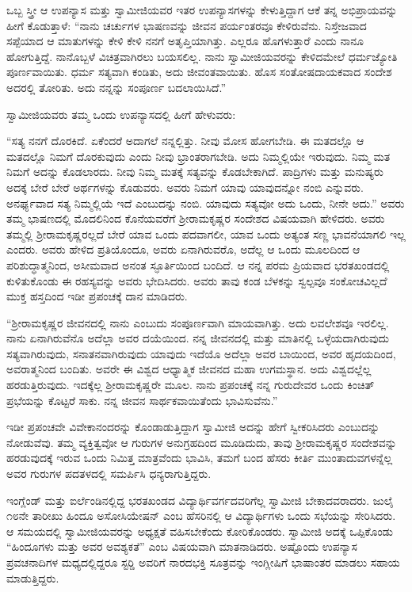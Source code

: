  ಒಬ್ಬ ಸ್ತ್ರೀ ಆ ಉಪನ್ಯಾಸ ಮತ್ತು ಸ್ವಾಮೀಜಿಯವರ ಇತರ ಉಪನ್ಯಾಸಗಳನ್ನು ಕೇಳುತ್ತಿದ್ದಾಗ ಆಕೆ ತನ್ನ ಅಭಿಪ್ರಾಯವನ್ನು ಹೀಗೆ ಕೊಡುತ್ತಾಳೆ: “ನಾನು ಚರ್ಚುಗಳ ಭಾಷಣವನ್ನು ಜೀವನ ಪರ್ಯಂತರವೂ ಕೇಳಿರುವೆನು. ನಿಸ್ತೇಜವಾದ ಸಪ್ಪೆಯಾದ ಆ ಮಾತುಗಳನ್ನು ಕೇಳಿ ಕೇಳಿ ನನಗೆ ಅತೃಪ್ತಿಯಾಗಿತ್ತು. ಎಲ್ಲರೂ ಹೊಗಳುತ್ತಾರೆ ಎಂದು ನಾನೂ ಹೋಗುತ್ತಿದ್ದೆ. ನಾನೊಬ್ಬಳೆ ವಿಚಿತ್ರವಾಗಿರಲು ಬಯಸಲಿಲ್ಲ. ನಾನು ಸ್ವಾಮೀಜಿಯವರನ್ನು ಕೇಳಿದಮೇಲೆ ಧರ್ಮಜ್ಯೋತಿ ಪೂರ್ಣವಾಯಿತು. ಧರ್ಮ ಸತ್ಯವಾಗಿ ಕಂಡಿತು, ಅದು ಜೀವಂತವಾಯಿತು. ಹೊಸ ಸಂತೋಷದಾಯಕವಾದ ಸಂದೇಶ ಅದರಲ್ಲಿ ತೋರಿತು. ಅದು ನನ್ನನ್ನು ಸಂಪೂರ್ಣ ಬದಲಾಯಿಸಿದೆ.” 

 ಸ್ವಾಮೀಜಿಯವರು ತಮ್ಮ ಒಂದು ಉಪನ್ಯಾಸದಲ್ಲಿ ಹೀಗೆ ಹೇಳುವರು: 

 “ಸತ್ಯ ನನಗೆ ದೊರಕಿದೆ. ಏಕೆಂದರೆ ಅದಾಗಲೆ ನನ್ನಲ್ಲಿತ್ತು. ನೀವು ಮೋಸ ಹೋಗಬೇಡಿ. ಈ ಮತದಲ್ಲೊ ಆ ಮತದಲ್ಲೊ ನಿಮಗೆ ದೊರಕುವುದು ಎಂದು ನೀವು ಭ್ರಾಂತರಾಗಬೇಡಿ. ಅದು ನಿಮ್ಮಲ್ಲಿಯೇ ಇರುವುದು. ನಿಮ್ಮ ಮತ ನಿಮಗೆ ಅದನ್ನು ಕೊಡಲಾರದು. ನೀವು ನಿಮ್ಮ ಮತಕ್ಕೆ ಸತ್ಯವನ್ನು ಕೊಡಬೇಕಾಗಿದೆ. ಪಾದ್ರಿಗಳು ಮತ್ತು ಮನುಷ್ಯರು ಅದಕ್ಕೆ ಬೇರೆ ಬೇರೆ ಅರ್ಥಗಳನ್ನು ಕೊಡುವರು. ಅವರು ನಿಮಗೆ ಯಾವು ಯಾವುದನ್ನೋ ನಂಬಿ ಎನ್ನುವರು. ಅನರ್ಘ್ಯವಾದ ಸತ್ಯ ನಿಮ್ಮಲ್ಲಿಯೆ ಇದೆ ಎಂಬುದನ್ನು ನಂಬಿ. ಯಾವುದು ಸತ್ಯವೋ ಅದು ಒಂದು, ನೀನೇ ಅದು.” ಅವರು ತಮ್ಮ ಭಾಷಣದಲ್ಲಿ ಮೊದಲಿನಿಂದ ಕೊನೆಯವರೆಗೆ ಶ‍್ರೀರಾಮಕೃಷ್ಣರ ಸಂದೇಶದ ವಿಷಯವಾಗಿ ಹೇಳಿದರು. ಅವರು ತಮ್ಮಲ್ಲಿ ಶ‍್ರೀರಾಮಕೃಷ್ಣರಲ್ಲದೆ ಬೇರೆ ಯಾವ ಒಂದು ಪದವಾಗಲೀ, ಯಾವ ಒಂದು ಅತ್ಯಂತ ಸಣ್ಣ ಭಾವನೆಯಾಗಲಿ ಇಲ್ಲ ಎಂದರು. ಅವರು ಹೇಳಿದ ಪ್ರತಿಯೊಂದೂ, ಅವರು ಏನಾಗಿರುವರೊ, ಅದೆಲ್ಲ ಆ ಒಂದು ಮೂಲದಿಂದ ಆ ಪರಿಶುದ್ಧಾತ್ಮನಿಂದ, ಅಸೀಮವಾದ ಅನಂತ ಸ್ಫೂರ್ತಿಯಿಂದ ಬಂದಿದೆ. ಆ ನನ್ನ ಪರಮ ಪ್ರಿಯವಾದ ಭರತಖಂಡದಲ್ಲಿ ಕುಳಿತುಕೊಂಡು ಈ ರಹಸ್ಯವನ್ನು ಅವರು ಭೇದಿಸಿದರು. ಅವರು ತಾವು ಕಂಡ ಬೆಳಕನ್ನು ಸ್ವಲ್ಪವೂ ಸಂಕೋಚವಿಲ್ಲದೆ ಮುಕ್ತ ಹಸ್ತದಿಂದ ಇಡೀ ಪ್ರಪಂಚಕ್ಕೆ ದಾನ ಮಾಡಿದರು. 

 “ಶ‍್ರೀರಾಮಕೃಷ್ಣರ ಜೀವನದಲ್ಲಿ ನಾನು ಎಂಬುದು ಸಂಪೂರ್ಣವಾಗಿ ಮಾಯವಾಗಿತ್ತು. ಅದು ಲವಲೇಶವೂ ಇರಲಿಲ್ಲ. ನಾನು ಏನಾಗಿರುವೆನೊ ಅದೆಲ್ಲಾ ಅವರ ದಯೆಯಿಂದ. ನನ್ನ ಜೀವನದಲ್ಲಿ ಮತ್ತು ಮಾತಿನಲ್ಲಿ ಒಳ್ಳೆಯದಾಗಿರುವುದು ಸತ್ಯವಾಗಿರುವುದು, ಸನಾತನವಾಗಿರುವುದು ಯಾವುದು ಇದೆಯೊ ಅದೆಲ್ಲಾ ಅವರ ಬಾಯಿಂದ, ಅವರ ಹೃದಯದಿಂದ, ಅವರಾತ್ಮನಿಂದ ಬಂದಿತು. ಅವರೇ ಈ ವಿಶ್ವದ ಆಧ್ಯಾತ್ಮಿಕ ಜೀವನದ ಮಹಾ ಉಗಮಸ್ಥಾನ. ಅದು ವಿಶ್ವದಲ್ಲೆಲ್ಲ ಹರಡುತ್ತಿರುವುದು. ಇದಕ್ಕೆಲ್ಲ ಶ‍್ರೀರಾಮಕೃಷ್ಣರೇ ಮೂಲ. ನಾನು ಪ್ರಪಂಚಕ್ಕೆ ನನ್ನ ಗುರುದೇವರ ಒಂದು ಕಿಂಚಿತ್ ಪ್ರಭೆಯನ್ನು ಕೊಟ್ಟರೆ ಸಾಕು. ನನ್ನ ಜೀವನ ಸಾರ್ಥಕವಾಯಿತೆಂದು ಭಾವಿಸುವೆನು.” 

 ಇಡೀ ಪ್ರಪಂಚವೇ ವಿವೇಕಾನಂದರನ್ನು ಕೊಂಡಾಡುತ್ತಿದ್ದಾಗ ಸ್ವಾಮೀಜಿ ಅದನ್ನು ಹೇಗೆ ಸ್ವೀಕರಿಸಿದರು ಎಂಬುದನ್ನು ನೋಡುವೆವು. ತಮ್ಮ ವ್ಯಕ್ತಿತ್ವವೋ ಆ ಗುರುಗಳ ಅನುಗ್ರಹದಿಂದ ಮೂಡಿದುದು, ತಾವು ಶ‍್ರೀರಾಮಕೃಷ್ಣರ ಸಂದೇಶವನ್ನು ಹರಡುವುದಕ್ಕೆ ಇರುವ ಒಂದು ನಿಮಿತ್ತ ಮಾತ್ರವೆಂದು ಭಾವಿಸಿ, ತಮಗೆ ಬಂದ ಹೆಸರು ಕೀರ್ತಿ ಮುಂತಾದುವಗಳನ್ನೆಲ್ಲ ಅವರ ಗುರುಗಳ ಪದತಳದಲ್ಲಿ ಸಮರ್ಪಿಸಿ ಧನ್ಯರಾಗುತ್ತಿದ್ದರು. 

 ಇಂಗ್ಲೆಂಡ್ ಮತ್ತು ಐರ್ಲೆಂಡಿನಲ್ಲಿದ್ದ ಭರತಖಂಡದ ವಿದ್ಯಾರ್ಥಿವರ್ಗದವರಿಗೆಲ್ಲ ಸ್ವಾಮೀಜಿ ಬೇಕಾದವರಾದರು. ಜುಲೈ ೧೮ನೇ ತಾರೀಖು ಹಿಂದೂ ಅಸೋಸಿಯೇಷನ್ ಎಂಬ ಹೆಸರಿನಲ್ಲಿ ಆ ವಿದ್ಯಾರ್ಥಿಗಳು ಒಂದು ಸಭೆಯನ್ನು ಸೇರಿಸಿದರು. ಆ ಸಮಯದಲ್ಲಿ ಸ್ವಾಮೀಜಿಯವರನ್ನು ಅಧ್ಯಕ್ಷತೆ ವಹಿಸಬೇಕೆಂದು ಕೋರಿಕೊಂಡರು. ಸ್ವಾಮೀಜಿ ಅದಕ್ಕೆ ಒಪ್ಪಿಕೊಂಡು “ಹಿಂದೂಗಳು ಮತ್ತು ಅವರ ಅವಶ್ಯಕತೆ” ಎಂಬ ವಿಷಯವಾಗಿ ಮಾತನಾಡಿದರು. ಅಷ್ಟೊಂದು ಉಪನ್ಯಾಸ ಪ್ರವಚನಾದಿಗಳ ಮಧ್ಯದಲ್ಲಿದ್ದರೂ ಸ್ಟರ‍್ಡಿ ಅವರಿಗೆ ನಾರದಭಕ್ತಿ ಸೂತ್ರವನ್ನು ಇಂಗ್ಲೀಷಿಗೆ ಭಾಷಾಂತರ ಮಾಡಲು ಸಹಾಯ ಮಾಡುತ್ತಿದ್ದರು. 

